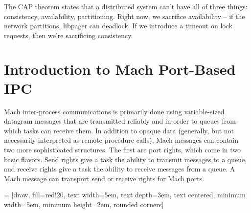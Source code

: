 \documentclass{article}
\begin{document}
The CAP theorem states that a distributed system can't have all of
three things: consistency, availability, partitioning.  Right now, we
sacrifice availability -- if the network partitions, libpager can
deadlock.  If we introduce a timeout on lock requests, then we're
sacrificing consistency.


\section{Introduction to Mach Port-Based IPC}

Mach inter-process communications is primarily done using
variable-sized datagram messages that are transmitted reliably and
in-order to queues from which tasks can receive them.  In addition to
opaque data (generally, but not necessarily interpreted as remote
procedure calls), Mach messages can contain two more sophisticated
structures.  The first are port rights, which come in two basic
flavors.  Send rights give a task the ability to transmit messages to
a queue, and receive rights give a task the ability to receive
messages from a queue.  A Mach message can transport send or receive
rights for Mach ports.

 = [draw, fill=red!20, text width=5em, text depth=3em, text centered,
  minimum width=5em, minimum height=2em, rounded corners]
\end{document}
